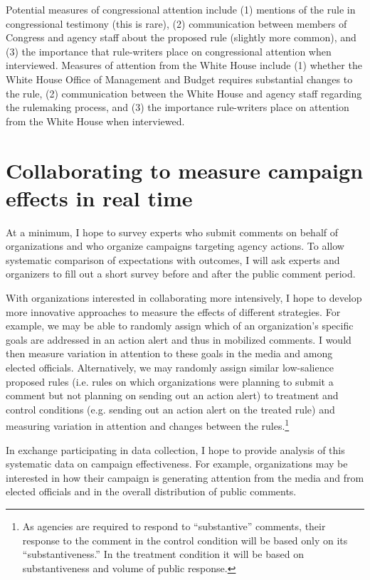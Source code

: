 \documentclass{article}
\begin{document}
Potential measures of congressional attention include (1) mentions of the rule in congressional testimony (this is rare), (2) communication between members of Congress and agency staff about the proposed rule (slightly more common), and (3) the importance that rule-writers place on congressional attention when interviewed. Measures of attention from the White House include (1) whether the White House Office of Management and Budget requires substantial changes to the rule,  (2) communication between the White House and agency staff regarding the rulemaking process, and (3) the importance rule-writers place on attention from the White House when interviewed. 


\section*{Collaborating to measure campaign effects in real time}

At a minimum, I hope to survey experts who submit comments on behalf of organizations and who organize campaigns targeting agency actions. To allow systematic comparison of expectations with outcomes, I will ask experts and organizers to fill out a short survey before and after the public comment period.

With organizations interested in collaborating more intensively, I hope to develop more innovative approaches to measure the effects of different strategies. For example, we may be able to randomly assign which of an organization's specific goals are addressed in an action alert and thus in mobilized comments. %
I would then measure variation in attention to these goals in the media and among elected officials.
Alternatively, we may randomly assign similar low-salience proposed rules (i.e. rules on which organizations were planning to submit a comment but not planning on sending out an action alert) to treatment and control conditions (e.g. sending out an action alert on the treated rule) and measuring variation in attention and changes between the rules.\footnote{As agencies are required to respond to ``substantive'' comments, their response to the comment in the control condition will be based only on its ``substantiveness.'' In the treatment condition it will be based on substantiveness and volume of public response.} 

In exchange participating in data collection, I hope to provide analysis of this systematic data on campaign effectiveness. For example, organizations may be interested in how their campaign is generating attention from the media and from elected officials and in the overall distribution of public comments.


\bigskip
\noindent

 
\end{document}

